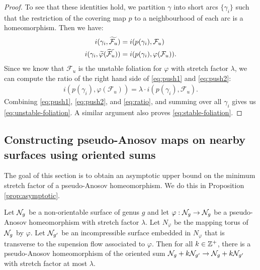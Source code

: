 \begin{proof}
  To see that these identities hold, we partition $\gamma$ into short arcs $\{\gamma_i\}$ such that the restriction of the covering map $p$ to a neighbourhood of each arc is a homeomorphism.
  Then we have:
  \begin{align}
  \label{eq:push1}
    i(\gamma_i, \widetilde{\mathcal{F}_u}) &= i(p(\gamma_i), \mathcal{F}_u) \\
  \label{eq:push2}
    i(\gamma_i, \widetilde{\varphi}(\widetilde{\mathcal{F}_u})) &= i(p(\gamma_i), \varphi(\mathcal{F}_u)).
  \end{align}
  Since we know that $\mathcal{F}_u$ is the unstable foliation for $\varphi$ with stretch factor $\lambda$, we can compute the ratio of the right hand side of \eqref{eq:push1} and \eqref{eq:push2}:
  \begin{align}
      \label{eq:ratio}
      i(p(\gamma_i), \varphi(\mathcal{F}_u)) = \lambda \cdot i(p(\gamma_i), \mathcal{F}_u).
  \end{align}
  Combining \eqref{eq:push1}, \eqref{eq:push2}, and \eqref{eq:ratio}, and summing over all $\gamma_i$ gives us \eqref{eq:unstable-foliation}. A similar argument also proves \eqref{eq:stable-foliation}.
\end{proof}



\subsection{Constructing pseudo-Anosov maps on nearby surfaces using oriented sums}
\label{sec:constr-psuedo-anos}
The goal of this section is to obtain an asymptotic upper bound on the minimum stretch factor of a pseudo-Anosov homeomorphism. We do this in Proposition \ref{prop:asymptotic}.


\begin{prop}\label{prop:asymptotic}
Let $\mathcal{N}_g$ be a non-orientable surface of genus $g$ and let $\varphi:\mathcal{N}_g\rightarrow \mathcal{N}_g$ be a pseudo-Anosov homeomorphism with stretch factor $\lambda$.  Let $N_\varphi$ be the mapping torus of $\mathcal{N}_g$ by $\varphi$.  Let $\mathcal{N}_{g'}$ be an incompressible surface embedded in $N_\varphi$ that is transverse to the supension flow associated to $\varphi$.  Then for all $k\in\mathbb{Z}^+$, there is a pseudo-Anosov homeomorphism of the oriented sum $\mathcal{N}_{g}+k\mathcal{N}_{g'}\rightarrow\mathcal{N}_{g}+k\mathcal{N}_{g'}$ with stretch factor at most $\lambda$.
\end{prop}

